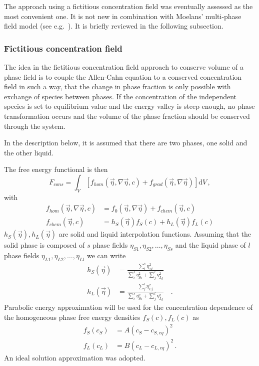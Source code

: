 	The approach using a fictitious concentration field was eventually assessed as the most convenient one. It is not new in combination with Moelans' multi-phase field model (see e.g.~\cite{Yadav2016,Yadav2018vol_cons}). It is briefly reviewed in the following subsection. 
		
		\subsubsection{Fictitious concentration field}
		The idea in the fictitious concentration field approach to conserve volume of a phase field is to couple the Allen-Cahn equation to a conserved concentration field in such a way, that the change in phase fraction is only possible with exchange of species between phases. If the concentration of the independent species is set to equilibrium value and the energy valley is steep enough, no phase transformation occurs and the volume of the phase fraction should be conserved through the system. 
		
		In the description below, it is assumed that there are two phases, one solid and the other liquid.
		
		The free energy functional is then
		\begin{equation}
			F_{cons} = \int_V \left[ f_{hom}(\vec{\eta},\nabla\vec{\eta},c) + f_{grad}(\vec{\eta},\nabla\vec{\eta}) \right] \mathrm{d}V \,,
		\end{equation}
		with   
		\begin{align}
			f_{hom}(\vec{\eta},\nabla\vec{\eta},c)  &= f_0(\vec{\eta},\nabla\vec{\eta}) + f_{chem}(\vec{\eta},c) \\
			f_{chem}(\vec{\eta},c) &= h_S(\vec{\eta})f_S(c) + h_L(\vec{\eta})f_L(c)
		\end{align}
		$h_S(\vec{\eta}), h_L(\vec{\eta})$ are solid and liquid interpolation functions. Assuming that the solid phase is composed of $s$ phase fields $\eta_{S1},\eta_{S2},\dots,\eta_{Ss}$ and the liquid phase of $l$ phase fields $\eta_{L1},\eta_{L2},\dots,\eta_{Ll}$ we can write
		\begin{align}
			h_S(\vec{\eta}) &= \frac{\sum_i^s \eta_{Si}^2}{\sum_i^s \eta_{Si}^2 + \sum_j^l \eta_{Lj}^2}   \\
			h_L(\vec{\eta}) &= \frac{\sum_j^l \eta_{Lj}^2}{\sum_i^s \eta_{Si}^2 + \sum_j^l \eta_{Lj}^2} \quad .
		\end{align}
		Parabolic energy approximation will be used for the concentration dependence of the homogeneous phase free energy densities $f_S(c), f_L(c)$ as
		\begin{align}
			f_S(c_S) &= A(c_S-c_{S,eq})^2 \\
			f_L(c_L) &= B(c_L-c_{L,eq})^2 \,.
		\end{align}
		An ideal solution approximation was adopted.
		
